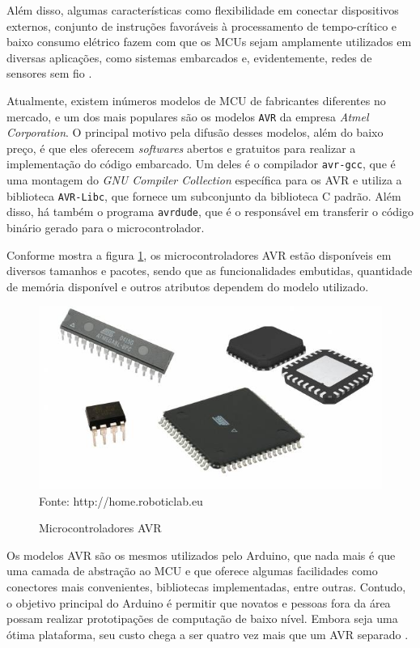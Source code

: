Além disso, algumas características como flexibilidade em conectar dispositivos externos, conjunto de
instruções favoráveis à processamento de tempo-crítico e baixo consumo elétrico fazem com que os MCUs sejam
amplamente utilizados em diversas aplicações, como sistemas embarcados e, evidentemente, redes de sensores sem
fio \cite{karl_willig2005}.

Atualmente, existem inúmeros modelos de MCU de fabricantes diferentes no mercado, e um dos mais populares são
os modelos \texttt{AVR} da empresa \textit{Atmel Corporation}. O principal motivo pela difusão desses modelos,
além do baixo preço, é que eles oferecem \textit{softwares} abertos e gratuitos para realizar a implementação
do código embarcado. Um deles é o compilador \texttt{avr-gcc}, que é uma montagem do \textit{GNU Compiler Collection}
específica para os AVR e utiliza a biblioteca \texttt{AVR-Libc}, que fornece um subconjunto da biblioteca C
padrão. Além disso, há também o programa \texttt{avrdude}, que é o responsável em transferir o código binário
gerado para o microcontrolador.

Conforme mostra a figura \ref{figura:avr}, os microcontroladores AVR estão disponíveis em diversos tamanhos e
pacotes, sendo que as funcionalidades embutidas, quantidade de memória disponível e outros atributos dependem
do modelo utilizado.

\begin{figure}[h]
	\caption{Microcontroladores AVR}
	\centering
	\includegraphics[scale=0.5]{../images/avr.jpg}
	\hspace{\linewidth}
	Fonte: http://home.roboticlab.eu
	\label{figura:avr}
\end{figure}

Os modelos AVR são os mesmos utilizados pelo Arduino, que nada mais é que uma camada de abstração ao MCU e que
oferece algumas facilidades como conectores mais convenientes, bibliotecas implementadas, entre outras.
Contudo, o objetivo principal do Arduino é permitir que novatos e pessoas fora da área possam realizar
prototipações de computação de baixo nível. Embora seja uma ótima plataforma, seu custo chega a ser quatro vez
mais que um AVR separado \cite{trevennor2012}.

